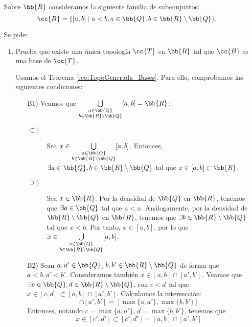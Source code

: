 \begin{ejercicio}
    Sobre $\bb{R}$ consideramos la siguiente familia de subconjuntos:
    \begin{equation*}
        \cc{B}=\{[a,b]\mid a<b,a\in \bb{Q}, b\in \bb{R}\setminus \bb{Q}\}.
    \end{equation*}

    Se pide:
    \begin{enumerate}[label=\alph*)]
        \item Prueba que existe una única topología $\cc{T}$ en $\bb{R}$ tal que $\cc{B}$ es una base de $\cc{T}$.

        Usamos el Teorema \ref{teo:TopoGenerada_Bases}. Para ello, comprobamos las siguientes condiciones:
        \begin{enumerate}
            \item[B1)] Veamos que $\bigcup\limits_{\substack{a\in \bb{Q}\\b\in \bb{R}\setminus\bb{Q}}} [a,b]=\bb{R}$:
            \begin{description}
                \item[$\subset)$]
                    Sea $x\in \bigcup\limits_{\substack{a\in \bb{Q}\\b\in \bb{R}\setminus\bb{Q}}} [a,b]$. Entonces, $\exists a\in \bb{Q}, b\in \bb{R}\setminus\bb{Q}$ tal que $x\in [a,b]\subset \bb{R}$.

                \item[$\supset)$]
                    Sea $x\in \bb{R}$. Por la densidad de $\bb{Q}$ en $\bb{R}$, tenemos que $\exists a\in \bb{Q}$ tal que $a<x$. Análogamente, por la densidad de $\bb{R}\setminus\bb{Q}$ en $\bb{R}$, tenemos que $\exists b\in \bb{R}\setminus\bb{Q}$ tal que $x<b$. Por tanto, $x\in [a,b]$, por lo que $x\in \bigcup\limits_{\substack{a\in \bb{Q}\\b\in \bb{R}\setminus\bb{Q}}} [a,b]$.
            \end{description}

            
            \item[B2)] Sean $a,a'\in \bb{Q}$, $b,b'\in \bb{R}\setminus\bb{Q}$ de forma que $a<b, a'<b'$. Consideramos también $x\in [a,b]\cap [a',b']$. Veamos que $\exists c\in \bb{Q}, d\in \bb{R}\setminus\bb{Q}$, con $c<d$ tal que $x\in [c,d]\subset [a,b]\cap [a',b']$. Calculamos la intersección:
            \begin{equation*}
                [a,b]\cap [a',b']=[\max\{a,a'\},\max\{b,b'\}]
            \end{equation*}
            Entonces, notando $c=\max\{a,a'\}$, $d=\max\{b,b'\}$, tenemos que
            \begin{equation*}
                x\in [c',d']\subset [c',d']=[a,b]\cap [a',b']
            \end{equation*}


\end{enumerate}
\end{enumerate}
\end{ejercicio}
